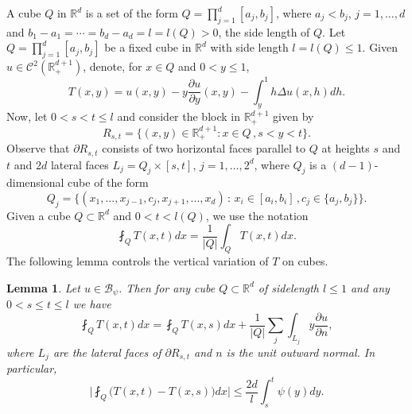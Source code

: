 \documentclass[11pt,letterpaper]{amsart}
\newtheorem{lem}{Lemma}[section]
\theoremstyle{definition}
\numberwithin{equation}{section}
\newcommand{\R}{\mathbb R}
\begin{document}
A cube $Q$ in $\R^d$  is a set of the form $Q = \prod_{j=1}^d [a_j, b_j]$, where $a_j < b_j$, $j=1, \ldots, d$ and $b_1 - a_1 =  \cdots = b_d - a_d = l = l(Q) >0 $, the side length of $Q$. Let $Q = \prod_{j=1}^d [a_j, b_j]$ be a fixed cube in $\R^d$ with side length $l = l(Q) \leq 1$. Given $u \in \mathcal{C}^2 (\R_+^{d+1})$, denote, for $x\in Q$ and $0 < y \leq 1$, 
\begin{equation}\label{T}
T(x,y) = u(x,y) - y \frac{\partial u}{\partial y}(x,y) - \int_y^1 h \Delta u(x,h) dh . 
\end{equation}
Now, let $0 < s < t \leq l $ and consider the block in $\R^{d+1}_{+}$ given by 
\begin{equation}\label{block}
R_{s,t} = \{ (x,y) \in \R^{d+1}_{+} : x\in Q \, , s < y < t \} . 
\end{equation}
Observe that $\partial R_{s,t}$ consists of two horizontal faces parallel to $Q$ at heights $s$ and $t$ and  $2d$ lateral faces  $L_j = Q_j \times [s,t]$, $j=1, \ldots , 2^d$, where $Q_j$ is a $(d-1)$-dimensional cube of the form
$$
Q_j = \{ (x_1,...,x_{j-1}, c_j , x_{j+1},...,x_d ) \, :  \, x_i \in [a_i, b_i ] \, , c_j \in \{ a_j , b_j \} \} . 
$$
Given a cube $ Q \subset \R^d$ and $0<t< l(Q)$, we use the notation
$$
\fint_Q T(x,t) dx = \frac{1}{|Q|} \int_Q T(x,t) dx .
$$
The following lemma controls the vertical variation of $T$ on cubes.
\begin{lem}
Let $u \in \mathcal{B}_{\psi}$. 
Then for any cube $Q \subset \R^d$  of sidelength $l \leq 1$ and any $0 < s \leq  t \leq l $ we have
\begin{equation}\label{mainlem}
\fint_Q T(x,t) dx = \fint_Q T(x,s) dx + \frac{1}{|Q|}\sum_j \int_{L_j} y \frac{\partial u}{\partial n}, 
\end{equation}
where $L_j$ are the lateral faces of $\partial R_{s,t}$ and $n$ is the unit outward normal. In particular,
\begin{equation}\label{main2}
\Big | \fint_Q  \big ( T(x,t) - T(x,s) \big ) dx \Big | \leq \frac{2d}{l} \int_s^t \psi (y) dy . 
\end{equation}
\end{lem}
\end{document}

